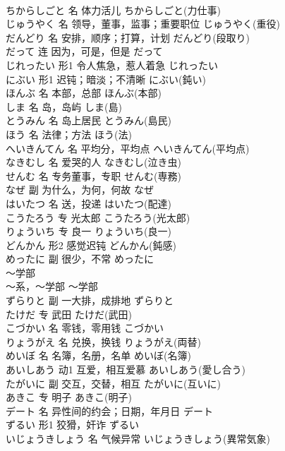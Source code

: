 \documentclass[8pt]{extreport}
\begin{document}
\begin{CJK}{UTF8}{min}
\\	ちからしごと	名	体力活儿	ちからしごと(力仕事)	
\\	じゅうやく	名	领导，董事，监事；重要职位	じゅうやく(重役)	
\\	だんどり	名	安排，顺序；打算，计划	だんどり(段取り)	
\\	だって	连	因为，可是，但是	だって	
\\	じれったい	形1	令人焦急，惹人着急	じれったい	
\\	にぶい	形1	迟钝；暗淡；不清晰	にぶい(鈍い)	
\\	ほんぶ	名	本部，总部	ほんぶ(本部)	
\\	しま	名	岛，岛屿	しま(島)	
\\	とうみん	名	岛上居民	とうみん(島民)	
\\	ほう	名	法律；方法	ほう(法)	
\\	へいきんてん	名	平均分，平均点	へいきんてん(平均点)	
\\	なきむし	名	爱哭的人	なきむし(泣き虫)	
\\	せんむ	名	专务董事，专职	せんむ(専務)	
\\	なぜ	副	为什么，为何，何故	なぜ	
\\	はいたつ	名	送，投递	はいたつ(配達)	
\\	こうたろう	专	光太郎	こうたろう(光太郎)	
\\	りょういち	专	良一	りょういち(良一)	
\\	どんかん	形2	感觉迟钝	どんかん(鈍感)	
\\	めったに	副	很少，不常	めったに	
\\	～学部	
\\	～系，～学部	～学部	
\\	ずらりと	副	一大排，成排地	ずらりと	
\\	たけだ	专	武田	たけだ(武田)	
\\	こづかい	名	零钱，零用钱	こづかい	
\\	りょうがえ	名	兑换，换钱	りょうがえ(両替)	
\\	めいぼ	名	名簿，名册，名单	めいぼ(名簿)	
\\	あいしあう	动1	互爱，相互爱慕	あいしあう(愛し合う)	
\\	たがいに	副	交互，交替，相互	たがいに(互いに)	
\\	あきこ	专	明子	あきこ(明子)	
\\	デート	名	异性间的约会；日期，年月日	デート	
\\	ずるい	形1	狡猾，奸诈	ずるい	
\\	いじょうきしょう	名	气候异常	いじょうきしょう(異常気象)	

\end{CJK}
\end{document}
